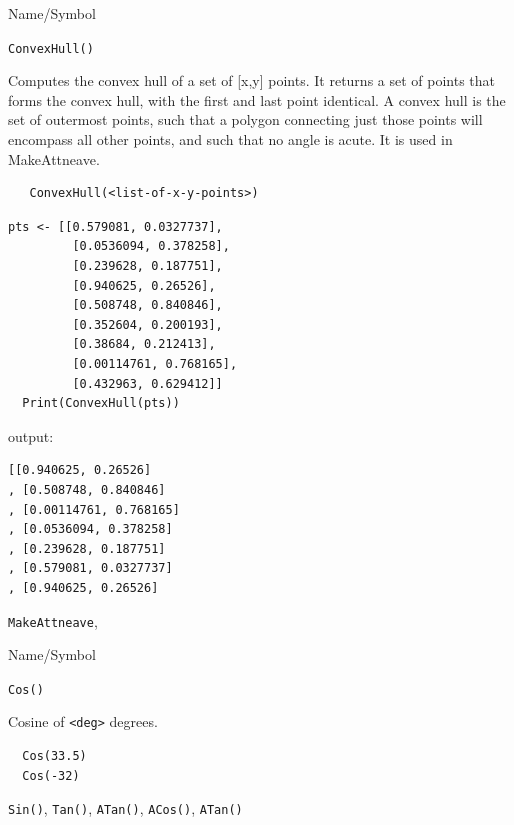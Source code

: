 \begin{desc}{Name/Symbol}
\item[Name/Symbol] \verb+ConvexHull()+

\item[Description]	Computes the convex hull of a set of [x,y]
  points. It returns a set of points that forms the convex hull, with
  the first and last point identical.  A convex hull is the set of
  outermost points, such that a polygon connecting just those points
  will encompass all other points, and such that no angle is acute.
  It is used in MakeAttneave.

\item[Usage]
\begin{verbatim}
   ConvexHull(<list-of-x-y-points>)
\end{verbatim}

\item[Example]	
\begin{verbatim} 
pts <- [[0.579081, 0.0327737], 
         [0.0536094, 0.378258], 
         [0.239628, 0.187751], 
         [0.940625, 0.26526], 
         [0.508748, 0.840846],
         [0.352604, 0.200193], 
         [0.38684, 0.212413],
         [0.00114761, 0.768165],
         [0.432963, 0.629412]]
  Print(ConvexHull(pts))

\end{verbatim}

output:
\begin{verbatim}
[[0.940625, 0.26526]
, [0.508748, 0.840846]
, [0.00114761, 0.768165]
, [0.0536094, 0.378258]
, [0.239628, 0.187751]
, [0.579081, 0.0327737]
, [0.940625, 0.26526]

\end{verbatim}


\item[See Also]
  \verb+MakeAttneave+,

\end{desc}




\begin{desc}{Name/Symbol}
\item[Name/Symbol]  	\verb+Cos()+
			 
\item[Description] 	Cosine of \verb+<deg>+ degrees.

\item[Usage]		
\item[Example]	
\begin{verbatim}
  Cos(33.5)
  Cos(-32)
\end{verbatim}

\item[See Also]     	\verb+Sin()+, \verb+Tan()+, \verb+ATan()+, \verb+ACos()+, \verb+ATan()+
\end{desc}




